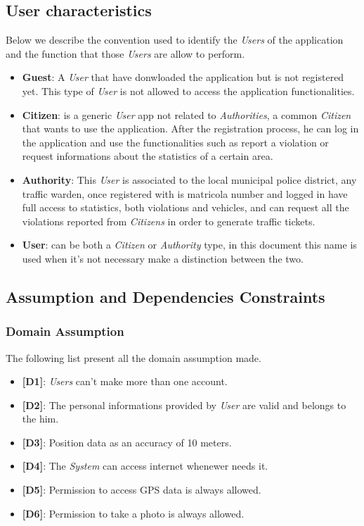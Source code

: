 \documentclass{article}
\begin{document}
\subsection{User characteristics}
Below we describe the convention used to identify the \textit{Users} of the application and the function that those 
\textit{Users} are allow to perform.
\begin{itemize}
    \item \textbf{Guest}: A \textit{User} that have donwloaded the application but is not 
    registered yet. This type of \textit{User} is not allowed to access 
    the application functionalities.
    \item \textbf{Citizen}: is a generic \textit{User} app not related to \textit{Authorities}, a 
    common \textit{Citizen} that wants to use the application. After the registration process, he can 
    log in the application and use the functionalities such as report a violation or request 
    informations about the statistics of a certain area.
    \item \textbf{Authority}: This \textit{User} is associated to the local municipal
    police district, any traffic warden, once registered with 
    is matricola number and logged in have full access to statistics, both violations and vehicles, and 
    can request all the violations reported from \textit{Citizens} in order to generate traffic tickets. 
    \item \textbf{User}: can be both a \textit{Citizen} or \textit{Authority} type, in this document
    this name is used when it's not necessary make a distinction 
    between the two.
\end{itemize}

\subsection{Assumption and Dependencies Constraints}
\subsubsection{Domain Assumption}
The following list present all the domain assumption made.
\begin{itemize}
    \item \textbf{[D1]}: \textit{Users} can't make more than one account.
    \item \textbf{[D2]}: The personal informations provided by \textit{User} are valid and belongs to the him.
    \item \textbf{[D3]}: Position data as an accuracy of 10 meters.
    \item \textbf{[D4]}: The \textit{System} can access internet whenewer needs it.
    \item \textbf{[D5]}: Permission to access GPS data is always allowed.
    \item \textbf{[D6]}: Permission to take a photo is always allowed. 
\end{itemize}
\end{document}
